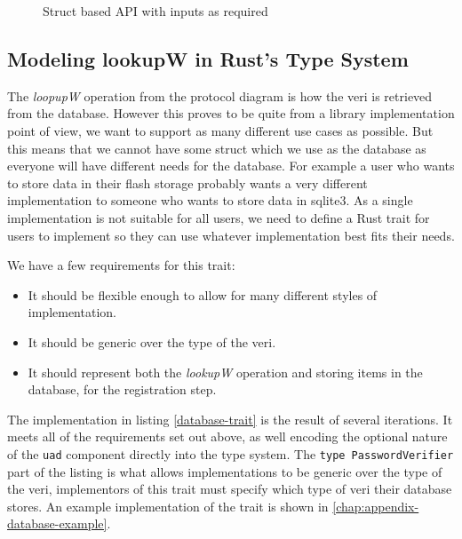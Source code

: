 \begin{figure}[H]

  \caption{Struct based API with inputs as required}
  \label{fig:actual-lib-structure}
\end{figure}

\subsection{Modeling lookupW in Rust’s Type System}
The \textit{loopupW} operation from the protocol diagram is how the \gls{veri} is retrieved from the database.
However this proves to be quite from a library implementation point of view, we want to support as many different use cases as possible.
But this means that we cannot have some struct which we use as the database as everyone will have different needs for the database.
For example a user who wants to store data in their flash storage probably wants a very different implementation to someone who wants to store data in sqlite3.
As a single implementation is not suitable for all users, we need to define a Rust trait for users to implement so they can use whatever implementation best fits their needs.

We have a few requirements for this trait:
\begin{itemize}
  \item{It should be flexible enough to allow for many different styles of implementation.}
  \item{It should be generic over the type of the \gls{veri}.}
  \item{It should represent both the \textit{lookupW} operation and storing items in the database, for the registration step.}
\end{itemize}


The implementation in listing \ref{database-trait} is the result of several iterations.
It meets all of the requirements set out above, as well encoding the optional nature of the \texttt{uad} component directly into the type system.
The \texttt{type PasswordVerifier} part of the listing is what allows implementations to be generic over the type of the \gls{veri}, implementors of this trait must specify which type of \gls{veri} their database stores.
An example implementation of the trait is shown in \cref{chap:appendix-database-example}.

